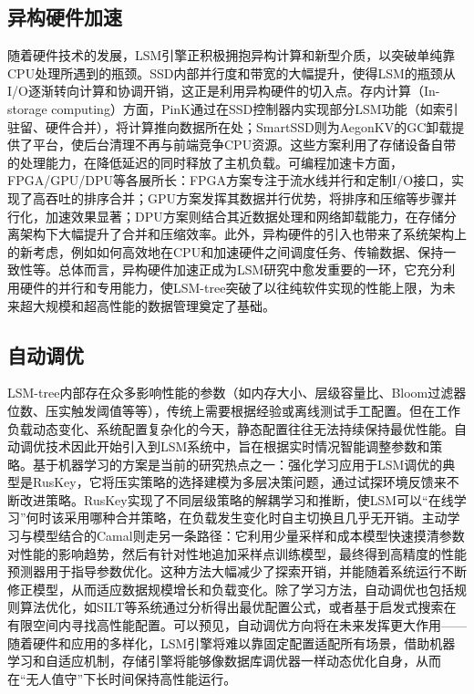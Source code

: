 \documentclass[lang=cn,11pt,a4paper]{elegantpaper}
\begin{document}
\subsection{异构硬件加速}
随着硬件技术的发展，LSM引擎正积极拥抱异构计算和新型介质，以突破单纯靠CPU处理所遇到的瓶颈。SSD内部并行度和带宽的大幅提升，使得LSM的瓶颈从I/O逐渐转向计算和协调开销，这正是利用异构硬件的切入点。存内计算（In-storage computing）方面，PinK通过在SSD控制器内实现部分LSM功能（如索引驻留、硬件合并），将计算推向数据所在处；SmartSSD则为AegonKV的GC卸载提供了平台，使后台清理不再与前端竞争CPU资源。这些方案利用了存储设备自带的处理能力，在降低延迟的同时释放了主机负载。可编程加速卡方面，FPGA/GPU/DPU等各展所长：FPGA方案专注于流水线并行和定制I/O接口，实现了高吞吐的排序合并；GPU方案发挥其数据并行优势，将排序和压缩等步骤并行化，加速效果显著；DPU方案则结合其近数据处理和网络卸载能力，在存储分离架构下大幅提升了合并和压缩效率。此外，异构硬件的引入也带来了系统架构上的新考虑，例如如何高效地在CPU和加速硬件之间调度任务、传输数据、保持一致性等。总体而言，异构硬件加速正成为LSM研究中愈发重要的一环，它充分利用硬件的并行和专用能力，使LSM-tree突破了以往纯软件实现的性能上限，为未来超大规模和超高性能的数据管理奠定了基础。

\subsection{自动调优}
LSM-tree内部存在众多影响性能的参数（如内存大小、层级容量比、Bloom过滤器位数、压实触发阈值等等），传统上需要根据经验或离线测试手工配置。但在工作负载动态变化、系统配置复杂化的今天，静态配置往往无法持续保持最优性能。自动调优技术因此开始引入到LSM系统中，旨在根据实时情况智能调整参数和策略。基于机器学习的方案是当前的研究热点之一：强化学习应用于LSM调优的典型是RusKey，它将压实策略的选择建模为多层决策问题，通过试探环境反馈来不断改进策略。RusKey实现了不同层级策略的解耦学习和推断，使LSM可以“在线学习”何时该采用哪种合并策略，在负载发生变化时自主切换且几乎无开销。主动学习与模型结合的Camal则走另一条路径：它利用少量采样和成本模型快速摸清参数对性能的影响趋势，然后有针对性地追加采样点训练模型，最终得到高精度的性能预测器用于指导参数优化。这种方法大幅减少了探索开销，并能随着系统运行不断修正模型，从而适应数据规模增长和负载变化。除了学习方法，自动调优也包括规则算法优化，如SILT等系统通过分析得出最优配置公式，或者基于启发式搜索在有限空间内寻找高性能配置。可以预见，自动调优方向将在未来发挥更大作用——随着硬件和应用的多样化，LSM引擎将难以靠固定配置适配所有场景，借助机器学习和自适应机制，存储引擎将能够像数据库调优器一样动态优化自身，从而在“无人值守”下长时间保持高性能运行。
\end{document}

